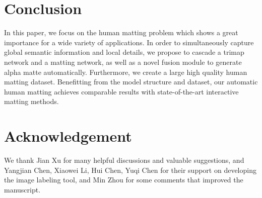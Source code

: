 \begin{comment}
	


\paragraph{\textbf{virtual photo studio}}

\begin{figure*}
\subfigure[]{
\label{application1} \texttt{[image: fig/application.jpg]}
}
\subfigure[]{
\label{application2} \texttt{[image: fig/application2.jpg]}}
\caption{Application of our SHM, virtual background for: (a) photographic model (b) live streaming model, images in the red bracket are the original natural images.}
\label{application} \end{figure*}


\paragraph{\textbf{livestreaming}}
\end{comment}

\section{Conclusion}

In this paper, we focus on the human matting problem which shows a great importance for a wide variety of applications. 
In order to simultaneously capture global semantic information and local details, we propose to cascade a trimap network and a matting network, as well as a novel fusion module to generate alpha matte automatically.
Furthermore, we create a large high quality human matting dataset.
Benefitting from the model structure and dataset, 
our automatic human matting achieves comparable results with state-of-the-art interactive matting methods.

\section*{Acknowledgement}

We thank Jian Xu for many helpful discussions and valuable suggestions, and Yangjian Chen, Xiaowei Li, Hui Chen, Yuqi Chen for their support on developing the image labeling tool, and Min Zhou for some comments that improved the manuscript.





